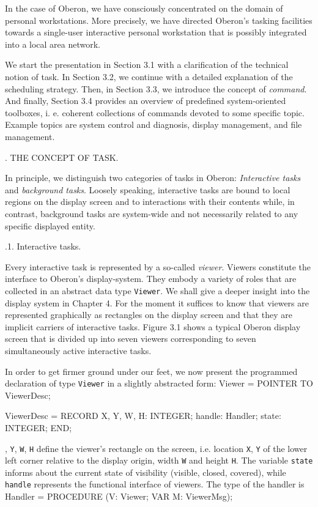 In the case of Oberon, we have consciously concentrated on the domain
of personal workstations. More precisely, we have directed Oberon's
tasking facilities towards a single-user interactive personal
workstation that is possibly integrated into a local area network.

We start the presentation in Section 3.1 with a clarification of the
technical notion of task. In Section 3.2, we continue with a detailed
explanation of the scheduling strategy. Then, in Section 3.3, we
introduce the concept of {\it command\/}. And finally, Section 3.4 provides an
overview of predefined system-oriented toolboxes, i. e. coherent
collections of commands devoted to some specific topic. Example topics
are system control and diagnosis, display management, and file
management.

. THE CONCEPT OF TASK.

In principle, we distinguish two categories of tasks in Oberon: {\it
  Interactive tasks\/} and {\it background tasks\/}. Loosely speaking,
interactive tasks are bound to local regions on the display screen and
to interactions with their contents while, in contrast, background
tasks are system-wide and not necessarily related to any specific
displayed entity.

.1. Interactive tasks.

Every interactive task is represented by a so-called {\it viewer\/}. Viewers
constitute the interface to Oberon's display-system. They embody a
variety of roles that are collected in an abstract data type
{\tt Viewer\/}. We shall give a deeper insight into the display system in
Chapter 4. For the moment it suffices to know that viewers are
represented graphically as rectangles on the display screen and that
they are implicit carriers of interactive tasks. Figure 3.1 shows a
typical Oberon display screen that is divided up into seven viewers
corresponding to seven simultaneously active interactive tasks.

In order to get firmer ground under our feet, we now present the programmed declaration of type {\tt Viewer\/} in a slightly abstracted form:
\begintt
Viewer = POINTER TO ViewerDesc;

ViewerDesc = RECORD X, Y, W, H: INTEGER;
  handle: Handler;
  state: INTEGER;
END;
\endtt

, {\tt Y\/}, {\tt W\/}, {\tt H\/} define the viewer's rectangle on the screen, i.e. location
{\tt X\/}, {\tt Y\/} of the lower left corner relative to the display origin, width {\tt W\/}
and height {\tt H\/}. The variable {\tt state\/} informs about the current state of
visibility (visible, closed, covered), while {\tt handle\/} represents the
functional interface of viewers. The type of the handler is
\begintt
Handler = PROCEDURE (V: Viewer; VAR M: ViewerMsg);
\endtt

